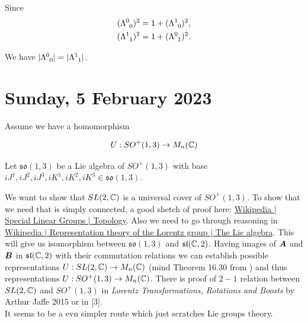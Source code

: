 \documentclass[main.tex]{subfiles}
\begin{document}
Since
\begin{align}
& (\tensor{\Lambda}{^0_0})^2 = 1 +  (\tensor{\Lambda}{^1_0})^2, \\
& (\tensor{\Lambda}{^1_1})^2 = 1 +  (\tensor{\Lambda}{^0_1})^2.
\end{align}

We have $|\tensor{\Lambda}{^0_0}| = |\tensor{\Lambda}{^1_1}|$.

\section{Sunday, 5 February 2023}

Assume we have a homomorphism

\begin{equation}
U: SO^{+}(1, 3)\to M_n(\mathbb{C})
\end{equation}

Let $\mathfrak{so}(1,3)$ be a Lie algebra of $SO^{+}(1, 3)$ with base $iJ^1, iJ^2, iJ^3, iK^1, iK^2, iK^3\in \mathfrak{so}(1,3)$.

We want to show that $SL(2, \mathbb{C})$ is a universal cover of $SO^{+}(1, 3)$. To show that we need that is simply connected, a good shetch of proof here: \href{https://en.wikipedia.org/wiki/Special_linear_group#Topology}{Wikipedia | Special Linear Groups | Topology}. Also we need to go through reasoning in \href{https://en.wikipedia.org/wiki/Representation_theory_of_the_Lorentz_group#The_Lie_algebra}{Wikipedia | Representation theory of the Lorentz group | The Lie algebra}. This will give us isomorphism between $\mathfrak{so}(1,3)$ and $\mathfrak{sl}(\mathbb{C},2)$. Having images of $\boldsymbol{A}$ and $\boldsymbol{B}$ in $\mathfrak{sl}(\mathbb{C},2)$ with their commutation relations we can establish possible representations $U: SL(2, \mathbb{C}) \to M_n(\mathbb{C})$ (mind Theorem 16.30 from \cite{hall2013}) and thus representations $U: SO^{+}(1, 3)\to M_n(\mathbb{C})$. There is proof of $2-1$ relation between $SL(2, \mathbb{C})$ and $SO^{+}(1, 3)$ in \textit{Lorentz Transformations, Rotations and Boosts} by Arthur Jaffe 2015 or in \cite{moshe1977}[3].\\ 

It seems to be a evn simpler route which just scratches Lie groups theory.
\end{document}
